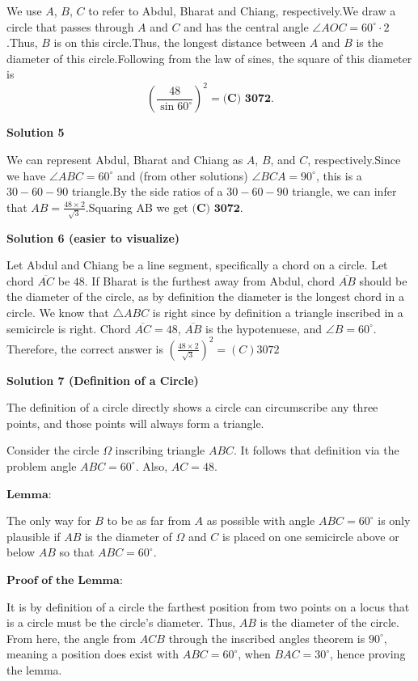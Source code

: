 \begin{enumerate}
We use $A$, $B$, $C$ to refer to Abdul, Bharat and Chiang, respectively.We draw a circle that passes through $A$ and $C$ and has the central angle $\angle AOC = 60^\circ \cdot 2$.Thus, $B$ is on this circle.Thus, the longest distance between $A$ and $B$ is the diameter of this circle.Following from the law of sines, the square of this diameter is
 \[ \left( \frac{48}{\sin 60^\circ} \right)^2 = \boxed{\textbf{(C) 3072}}. \]




\textbf{Solution 5}

We can represent Abdul, Bharat and Chiang as $A$, $B$, and $C$, respectively.Since we have $\angle ABC=60^\circ$ and  (from other solutions) $\angle BCA=90^\circ$, this is a $30-60-90$ triangle.By the side ratios of a $30-60-90$ triangle, we can infer that $AB=\frac{48\times 2}{\sqrt{3}}$.Squaring AB we get $\boxed{\textbf{(C) 3072}}$.

 



\textbf{Solution 6 (easier to visualize)}

Let Abdul and Chiang be a line segment, specifically a chord on a circle. Let chord $\overline{AC}$ be $48$. If Bharat is the furthest away from Abdul, chord $\overline{AB}$ should be the diameter of the circle, as by definition the diameter is the longest chord in a circle. We know that $\triangle {ABC}$ is right since by definition a triangle inscribed in a semicircle is right. Chord $\overline{AC}=48$, $\overline{AB}$ is the hypotenuese, and $\angle{B}=60^{\circ}$. Therefore, the correct answer is $(\frac{48\times{2}}{\sqrt{3}})^2=\boxed{(C) 3072}$




\textbf{Solution 7 (Definition of a Circle)}

The definition of a circle directly shows a circle can circumscribe any three points, and those points will always form a triangle.

 Consider the circle $\Omega$ inscribing triangle $ABC$. It follows that definition via the problem angle $ABC = 60^\circ$. Also, $AC = 48$.

 $\textbf{Lemma}$:

 The only way for $B$ to be as far from $A$ as possible with angle $ABC = 60^\circ$ is only plausible if $AB$ is the diameter of $\Omega$ and $C$ is placed on one semicircle above or below $AB$ so that $ABC = 60^\circ$.

 $\textbf{Proof of the Lemma}$:

 It is by definition of a circle the farthest position from two points on a locus that is a circle must be the circle's diameter. Thus, $AB$ is the diameter of the circle. From here, the angle from $ACB$ through the inscribed angles theorem is $90^\circ$, meaning a position does exist with $ABC = 60^\circ$, when $BAC = 30^\circ$, hence proving the lemma.


\end{enumerate}
